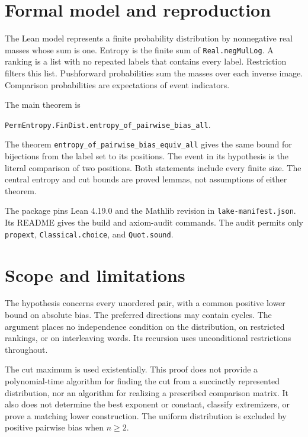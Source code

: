 \documentclass[11pt,a4paper]{article}
\begin{document}
\section{Formal model and reproduction}\label{sec:formal}

The Lean model represents a finite probability distribution by nonnegative
real masses whose sum is one. Entropy is the finite sum of
\texttt{Real.negMulLog}. A ranking is a list with no repeated labels that
contains every label. Restriction filters this list. Pushforward probabilities
sum the masses over each inverse image. Comparison probabilities are
expectations of event indicators.

The main theorem is
\begin{center}\small\texttt{PermEntropy.FinDist.entropy\_of\_pairwise\_bias\_all}.\end{center}
The theorem \texttt{entropy\_of\_pairwise\_bias\_equiv\_all} gives the same
bound for bijections from the label set to its positions. The event in its
hypothesis is the literal comparison of two positions.
Both statements include every finite size. The central entropy and cut
bounds are proved lemmas, not assumptions of either theorem.

The package pins Lean 4.19.0 and the Mathlib revision in
\texttt{lake-manifest.json}. Its README gives the build and axiom-audit
commands. The audit permits only \texttt{propext},
\texttt{Classical.choice}, and \texttt{Quot.sound}.

\section{Scope and limitations}\label{sec:limits}

The hypothesis concerns every unordered pair, with a common positive lower
bound on absolute bias. The preferred directions may contain cycles. The
argument places no independence condition on the distribution, on
restricted rankings, or on interleaving words. Its recursion uses
unconditional restrictions throughout.

The cut maximum is used existentially. This proof does not provide a
polynomial-time algorithm for finding the cut from a succinctly represented
distribution, nor an algorithm for realizing a prescribed comparison
matrix. It also does not determine the best exponent or constant, classify
extremizers, or prove a matching lower construction. The uniform
distribution is excluded by positive pairwise bias when $n\geq2$.
\end{document}
